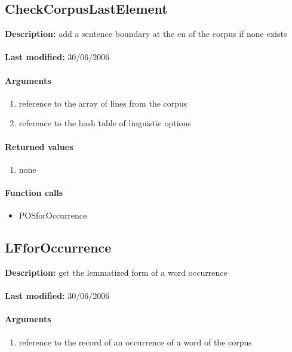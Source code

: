 \subsection{CheckCorpusLastElement}
\textbf{Description:} add a sentence boundary at the en of the corpus if none exists\\
\\\textbf{Last modified:} 30/06/2006

\paragraph{Arguments}
\begin{enumerate}
\item reference to the array of lines from the corpus
\item reference to the hash table of linguistic options
\end{enumerate}

\paragraph{Returned values}
\begin{enumerate}
\item none
\end{enumerate}

\paragraph{Function calls}
\begin{itemize}
\item POSforOccurrence
\end{itemize}

\subsection{LFforOccurrence}
\textbf{Description:} get the lemmatized form of a word occurrence\\
\\\textbf{Last modified:} 30/06/2006

\paragraph{Arguments}
\begin{enumerate}
\item reference to the record of an occurrence of a word of the corpus
\end{enumerate}

